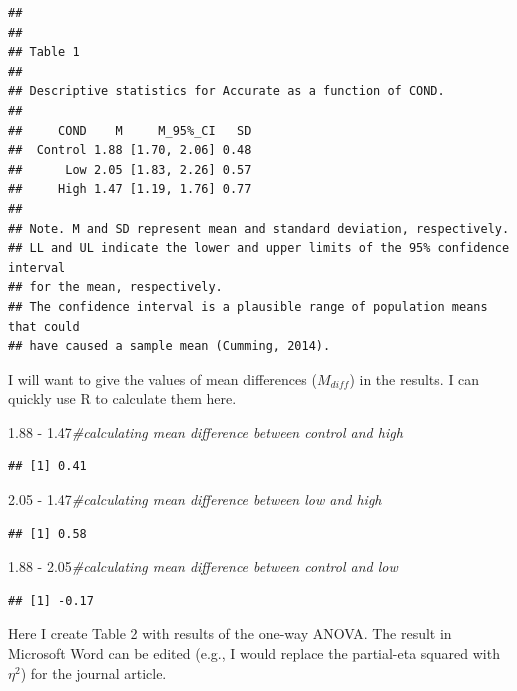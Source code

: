 \documentclass[
  english,
]{book}
\newenvironment{Shaded}{\begin{snugshade}}{\end{snugshade}}
\newcommand{\CommentTok}[1]{\textcolor[rgb]{0.56,0.35,0.01}{\textit{#1}}}
\newcommand{\FloatTok}[1]{\textcolor[rgb]{0.00,0.00,0.81}{#1}}
\newcommand{\SpecialCharTok}[1]{\textcolor[rgb]{0.00,0.00,0.00}{#1}}
\begin{document}
\begin{verbatim}
## 
## 
## Table 1 
## 
## Descriptive statistics for Accurate as a function of COND.  
## 
##     COND    M     M_95%_CI   SD
##  Control 1.88 [1.70, 2.06] 0.48
##      Low 2.05 [1.83, 2.26] 0.57
##     High 1.47 [1.19, 1.76] 0.77
## 
## Note. M and SD represent mean and standard deviation, respectively.
## LL and UL indicate the lower and upper limits of the 95% confidence interval 
## for the mean, respectively. 
## The confidence interval is a plausible range of population means that could 
## have caused a sample mean (Cumming, 2014).
\end{verbatim}

I will want to give the values of mean differences (\(M_{diff}\)) in the results. I can quickly use R to calculate them here.

\begin{Shaded}
\begin{Highlighting}[]
\FloatTok{1.88} \SpecialCharTok{{-}} \FloatTok{1.47}\CommentTok{\#calculating mean difference between control and high}
\end{Highlighting}
\end{Shaded}

\begin{verbatim}
## [1] 0.41
\end{verbatim}

\begin{Shaded}
\begin{Highlighting}[]
\FloatTok{2.05} \SpecialCharTok{{-}} \FloatTok{1.47}\CommentTok{\#calculating mean difference between low and high}
\end{Highlighting}
\end{Shaded}

\begin{verbatim}
## [1] 0.58
\end{verbatim}

\begin{Shaded}
\begin{Highlighting}[]
\FloatTok{1.88} \SpecialCharTok{{-}} \FloatTok{2.05}\CommentTok{\#calculating mean difference between  control and low}
\end{Highlighting}
\end{Shaded}

\begin{verbatim}
## [1] -0.17
\end{verbatim}

Here I create Table 2 with results of the one-way ANOVA. The result in Microsoft Word can be edited (e.g., I would replace the partial-eta squared with \(\eta^2\)) for the journal article.
\end{document}
